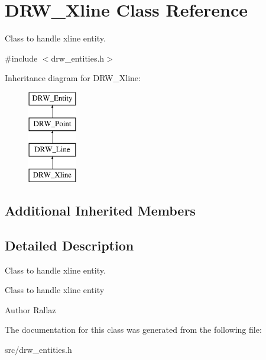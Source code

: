 \hypertarget{class_d_r_w___xline}{}\section{D\+R\+W\+\_\+\+Xline Class Reference}
\label{class_d_r_w___xline}


Class to handle xline entity.  




{\ttfamily \#include $<$drw\+\_\+entities.\+h$>$}

Inheritance diagram for D\+R\+W\+\_\+\+Xline\+:\begin{figure}[H]
\begin{center}
\leavevmode
\includegraphics[height=4.000000cm]{d7/d68/class_d_r_w___xline}
\end{center}
\end{figure}
\subsection*{Additional Inherited Members}


\subsection{Detailed Description}
Class to handle xline entity. 

Class to handle xline entity \begin{DoxyAuthor}{Author}
Rallaz 
\end{DoxyAuthor}


The documentation for this class was generated from the following file\+:\begin{DoxyCompactItemize}
\item 
src/drw\+\_\+entities.\+h\end{DoxyCompactItemize}
